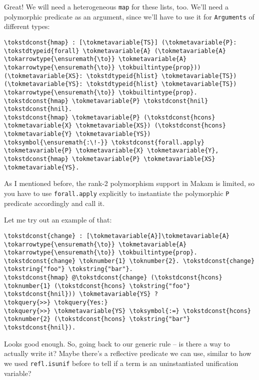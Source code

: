 \heroADVISOR{} Great! We will need a heterogeneous \texttt{map} for these
lists, too. We'll need a polymorphic predicate as an argument, since
we'll have to use it for \texttt{Arguments} of different types:

\begin{verbatim}
\tokstdconst{hmap} : [\tokmetavariable{TS}] (\tokmetavariable{P}: \tokstdtypeid{forall} \tokmetavariable{A} (\tokmetavariable{A} \tokarrowtype{\ensuremath{\to}} \tokmetavariable{A} \tokarrowtype{\ensuremath{\to}} \tokbuiltintype{prop})) (\tokmetavariable{XS}: \tokstdtypeid{hlist} \tokmetavariable{TS}) (\tokmetavariable{YS}: \tokstdtypeid{hlist} \tokmetavariable{TS}) \tokarrowtype{\ensuremath{\to}} \tokbuiltintype{prop}.
\tokstdconst{hmap} \tokmetavariable{P} \tokstdconst{hnil} \tokstdconst{hnil}.
\tokstdconst{hmap} \tokmetavariable{P} (\tokstdconst{hcons} \tokmetavariable{X} \tokmetavariable{XS}) (\tokstdconst{hcons} \tokmetavariable{Y} \tokmetavariable{YS}) \toksymbol{\ensuremath{:\!-}} \tokstdconst{forall.apply} \tokmetavariable{P} \tokmetavariable{X} \tokmetavariable{Y}, \tokstdconst{hmap} \tokmetavariable{P} \tokmetavariable{XS} \tokmetavariable{YS}.
\end{verbatim}

\noindent
As I mentioned before, the rank-2 polymorphism support in Makam is
limited, so you have to use \texttt{forall.apply} explicitly to
instantiate the polymorphic \texttt{P} predicate accordingly and call
it.

\heroSTUDENT{} Let me try out an example of that:

\begin{verbatim}
\tokstdconst{change} : [\tokmetavariable{A}]\tokmetavariable{A} \tokarrowtype{\ensuremath{\to}} \tokmetavariable{A} \tokarrowtype{\ensuremath{\to}} \tokbuiltintype{prop}. \tokstdconst{change} \toknumber{1} \toknumber{2}. \tokstdconst{change} \tokstring{"foo"} \tokstring{"bar"}.
\tokstdconst{hmap} @\tokstdconst{change} (\tokstdconst{hcons} \toknumber{1} (\tokstdconst{hcons} \tokstring{"foo"} \tokstdconst{hnil})) \tokmetavariable{YS} ?
\tokquery{>>} \tokquery{Yes:}
\tokquery{>>} \tokmetavariable{YS} \toksymbol{:=} \tokstdconst{hcons} \toknumber{2} (\tokstdconst{hcons} \tokstring{"bar"} \tokstdconst{hnil}).
\end{verbatim}

\noindent
Looks good enough. So, going back to our generic rule -- is there a way
to actually write it? Maybe there's a reflective predicate we can use,
similar to how we used \texttt{refl.isunif} before to tell if a term is
an uninstantiated unification variable?


